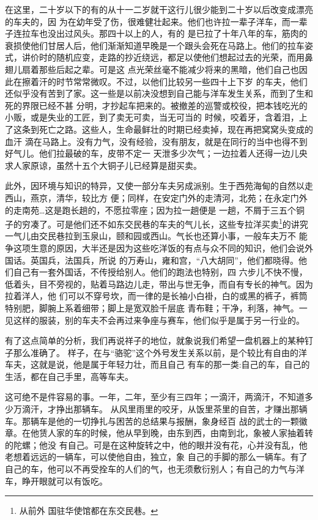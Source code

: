 \documentclass[11pt,a4paper,onecolumn]{article}
\begin{document}
在这里，二十岁以下的\myrule 有的从十一二岁就干这行儿\myrule 很少能到二十岁以后改变成漂亮的车夫的，因
为在幼年受了伤，很难健壮起来。他们也许拉一辈子洋车，而一辈子连拉车也没出过风头。那四十以上的人，有的
是已拉了十年八年的车，筋肉的衰损使他们甘居人后，他们渐渐知道早晚是一个跟头会死在马路上。他们的拉车姿
式，讲价时的随机应变，走路的抄近绕远，都足以使他们想起过去的光荣，而用鼻翅儿扇着那些后起之辈。可是这
点光荣丝毫不能减少将来的黑暗，他们自己也因此在擦着汗的时节常常微叹。不过，以他们比较另一些四十上下岁
的车夫，他们还似乎没有苦到了家。这一些是以前决没想到自己能与洋车发生关系，而到了生和死的界限已经不甚
分明，才抄起车把来的。被撤差的巡警或校役，把本钱吃光的小贩，或是失业的工匠，到了卖无可卖，当无可当的
时候，咬着牙，含着泪，上了这条到死亡之路。这些人，生命最鲜壮的时期已经卖掉，现在再把窝窝头变成的血汗
滴在马路上。没有力气，没有经验，没有朋友，就是在同行的当中也得不到好气儿。他们拉最破的车，皮带不定一
天泄多少次气；一边拉着人还得一边儿央求人家原谅，虽然十五个大铜子儿已经算是甜买卖。

此外，因环境与知识的特异，又使一部分车夫另成派别。生于西苑海甸的自然以走西山，燕京，清华，较比方
便；同样，在安定门外的走清河，北苑；在永定门外的走南苑\ldots 这是跑长趟的，不愿拉零座；因为拉一趟便是
一趟，不屑于三五个铜子的穷凑了。可是他们还不如东交民巷的车夫的气儿长，这些专拉洋买卖\footnote{从前外
  国驻华使馆都在东交民巷。}的讲究一气儿由交民巷拉到玉泉山，颐和园或西山。气长也还算小事，一般车夫万不
能争这项生意的原因，大半还是因为这些吃洋饭的有点与众不同的知识，他们会说外国话。英国兵，法国兵，所说
的万寿山，雍和宫，``八大胡同''，他们都晓得。他们自己有一套外国话，不传授给别人。他们的跑法也特别，四
六步儿不快不慢，低着头，目不旁视的，贴着马路边儿走，带出与世无争，而自有专长的神气。因为拉着洋人，他
们可以不穿号坎，而一律的是长袖小白褂，白的或黑的裤子，裤筒特别肥，脚腕上系着细带；脚上是宽双脸千层底
青布鞋；干净，利落，神气。一见这样的服装，别的车夫不会再过来争座与赛车，他们似乎是属于另一行业的。

有了这点简单的分析，我们再说祥子的地位，就象说\myrule 我们希望\myrule 一盘机器上的某种钉子那么准确了。
样子，在与``骆驼''这个外号发生关系以前，是个较比有自由的洋车夫，这就是说，他是属于年轻力壮，而且自己
有车的那一类:自己的车，自己的生活，都在自己手里，高等车夫。

这可绝不是件容易的事。一年，二年，至少有三四年；一滴汗，两滴汗，不知道多少万滴汗，才挣出那辆车。
从风里雨里的咬牙，从饭里茶里的自苦，才赚出那辆车。那辆车是他的一切挣扎与困苦的总结果与报酬，象身经百
战的武士的一颗徽章。在他赁人家的车的时候，他从早到晚，由东到西，由南到北，象被人家抽着转的陀螺；他没
有自己。可是在这种旋转之中，他的眼并没有花，心并没有乱，他老想着远远的一辆车，可以使他自由，独立，象
自己的手脚的那么一辆车。有了自己的车，他可以不再受拴车的人们的气，也无须敷衍别人；有自己的力气与洋
车，睁开眼就可以有饭吃。
\end{document}
